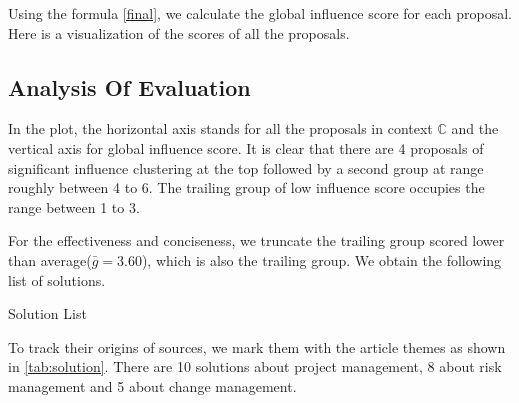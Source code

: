Using the formula \ref{final}, we calculate the global influence score for each proposal. Here is a visualization of the scores of all the proposals.

\begin{figure}[ht]
\centering
{}
\end{figure}

\subsection{Analysis Of Evaluation}

In the plot, the horizontal axis stands for all the proposals in context $\mathbb{C}$ and the vertical axis for global influence score. It is clear that there are 4 proposals of significant influence clustering at the top followed by a second group at range roughly between 4 to 6. The trailing group of low influence score occupies the range between 1 to 3.

For the effectiveness and conciseness, we truncate the trailing group scored lower than average($\bar{g}=3.60$), which is also the trailing group. We obtain the following list of solutions.

\begin{table}[ht]
\caption{Solution List}
\label{tab:solution}
\end{table}

To track their origins of sources, we mark them with the article themes as shown in \ref{tab:solution}. There are 10 solutions about project management, 8 about risk management and 5 about change management.
